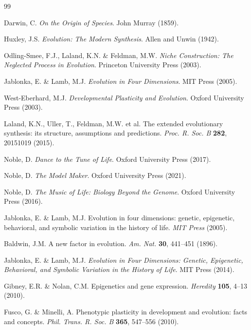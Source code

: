 \documentclass[twocolumn]{nature}
\begin{document}
\begin{thebibliography}{99}

 Darwin, C. \textit{On the Origin of Species}. John Murray (1859).

 Huxley, J.S. \textit{Evolution: The Modern Synthesis}. Allen and Unwin (1942).

 Odling-Smee, F.J., Laland, K.N. \& Feldman, M.W. \textit{Niche Construction: The Neglected Process in Evolution}. Princeton University Press (2003).

 Jablonka, E. \& Lamb, M.J. \textit{Evolution in Four Dimensions}. MIT Press (2005).

 West-Eberhard, M.J. \textit{Developmental Plasticity and Evolution}. Oxford University Press (2003).

 Laland, K.N., Uller, T., Feldman, M.W. et al. The extended evolutionary synthesis: its structure, assumptions and predictions. \textit{Proc. R. Soc. B} \textbf{282}, 20151019 (2015).

 Noble, D. \textit{Dance to the Tune of Life}. Oxford University Press (2017).

 Noble, D. \textit{The Model Maker}. Oxford University Press (2021).

 Noble, D. \textit{The Music of Life: Biology Beyond the Genome}. Oxford University Press (2016).

 Jablonka, E. \& Lamb, M.J. Evolution in four dimensions: genetic, epigenetic, behavioral, and symbolic variation in the history of life. \textit{MIT Press} (2005).

 Baldwin, J.M. A new factor in evolution. \textit{Am. Nat.} \textbf{30}, 441--451 (1896).

 Jablonka, E. \& Lamb, M.J. \textit{Evolution in Four Dimensions: Genetic, Epigenetic, Behavioral, and Symbolic Variation in the History of Life}. MIT Press (2014).

 Gibney, E.R. \& Nolan, C.M. Epigenetics and gene expression. \textit{Heredity} \textbf{105}, 4--13 (2010).

 Fusco, G. \& Minelli, A. Phenotypic plasticity in development and evolution: facts and concepts. \textit{Phil. Trans. R. Soc. B} \textbf{365}, 547--556 (2010).

\end{thebibliography}
\end{document}
